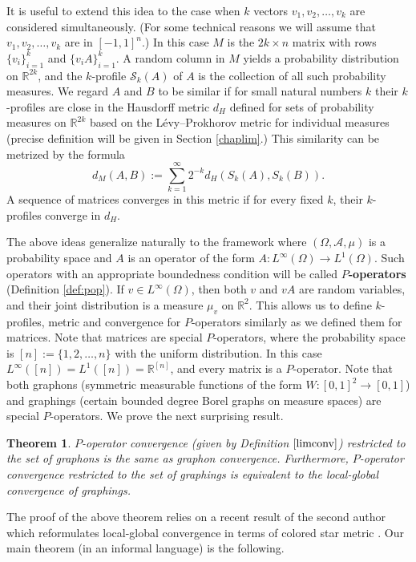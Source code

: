 \documentclass[a4wider]{amsart}
\newtheorem{theorem}{Theorem}[section]
\theoremstyle{definitionbreak}\newtheorem{D}[theorem]{Definition}
\theoremstyle{definitionbreak}\newtheorem*{D*}{Definition}
\begin{document}
It is useful to extend this idea to the case when $k$ vectors $v_1,v_2,\dots,v_k$ are considered simultaneously. (For some technical reasons we will assume that $v_1,v_2,\dots,v_k$ are in $[-1,1]^n$.) In this case $M$ is the $2k\times n$ matrix with rows $\{v_i\}_{i=1}^k$ and $\{v_iA\}_{i=1}^k$. A random column in $M$ yields a probability distribution on $\mathbb{R}^{2k}$, and the $k$-profile $\mathcal{S}_k(A)$ of $A$ is the collection of all such probability measures. We regard $A$ and $B$ to be similar if for small natural numbers $k$ their $k$-profiles are close in the Hausdorff metric $d_H$ defined for sets of probability measures on $\mathbb{R}^{2k}$ based on the L\'evy--Prokhorov metric for individual measures (precise definition will be given in Section \ref{chaplim}.) This similarity can be metrized by the formula
$$d_M(A,B):=\sum_{k=1}^\infty 2^{-k}d_H(S_k(A),S_k(B)).$$ A sequence of matrices converges in this metric if for every fixed $k$, their $k$-profiles converge in $d_H$.

The above ideas generalize naturally to the framework where $(\Omega,\mathcal{A},\mu)$ is a probability space and $A$ is an operator of the form $A:L^\infty(\Omega)\to L^1(\Omega)$. Such operators with an appropriate boundedness condition will be called {\bf $P$-operators} (Definition \ref{def:pop}). If $v\in L^\infty(\Omega)$, then both $v$ and $vA$ are random variables, and their joint distribution is a measure $\mu_v$ on $\mathbb{R}^2$. This allows us to define $k$-profiles, metric and convergence for $P$-operators similarly as we defined them for matrices. Note that matrices are special $P$-operators, where the probability space is $[n]:=\{1,2,\dots,n\}$ with the uniform distribution. In this case $L^\infty([n])=L^1([n])=\mathbb{R}^{[n]}$, and every matrix is a $P$-operator. Note that both graphons (symmetric measurable functions of the form $W:[0,1]^2\to[0,1]$) and graphings (certain bounded degree Borel graphs on measure spaces) are special $P$-operators. We prove the next surprising result.

\begin{theorem} $P$-operator convergence (given by Definition $\ref{limconv}$) restricted to the set of graphons is the same as graphon convergence. Furthermore, $P$-operator convergence restricted to the set of graphings is equivalent to the local-global convergence of graphings.
\end{theorem}

The proof of the above theorem relies on a recent result of the second author which reformulates local-global convergence in terms of colored star metric \cite{star}.  
Our main theorem (in an informal language) is the following.
\end{document}
